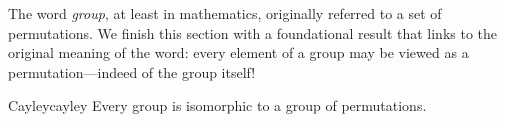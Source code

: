 % 



   
The word \emph{group}, at least in mathematics, originally referred to a set of permutations. We finish this section with a foundational result that links to the original meaning of the word: every element of a group may be viewed as a permutation---indeed of the group itself!

\begin{thm}{Cayley}{cayley}
	Every group is isomorphic to a group of permutations.
\end{thm}

